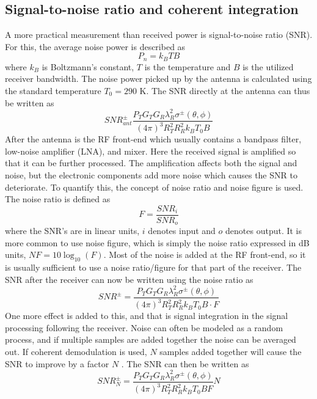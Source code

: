 \documentclass[10pt,a4paper]{eitExjobb}
\begin{document}
	\subsection{Signal-to-noise ratio and coherent integration}
	A more practical measurement than received power is signal-to-noise ratio (SNR). For this, the average noise power is described as \cite{Young2004}
	\begin{equation*}
	P_n = k_B TB
	\end{equation*}
	where $k_B$ is Boltzmann's constant, $T$ is the temperature and $B$ is the utilized receiver bandwidth. The noise power picked up by the antenna is calculated using the standard temperature $T_0 = 290$ K. The SNR directly at the antenna can thus be written as
	\begin{equation*}
	\mathit{SNR}^\pm_{ant} \frac{P_T G_T G_R \lambda_R^2 \sigma^\pm (\theta,\phi)}{(4\pi)^3 R_T^2 R_R^2 k_B T_0 B}
	\end{equation*}
	After the antenna is the RF front-end which usually contains a bandpass filter, low-noise amplifier (LNA), and mixer. Here the received signal is amplified so that it can be further processed. The amplification affects both the signal and noise, but the electronic components add more noise which causes the SNR to deteriorate. To quantify this, the concept of noise ratio and noise figure is used. The noise ratio is defined as \cite{Young2004}
	\begin{equation*}
	F = \frac{\mathit{SNR}_i}{\mathit{SNR}_o}
	\end{equation*}
	where the SNR's are in linear units, $i$ denotes input and $o$ denotes output. It is more common to use noise figure, which is simply the noise ratio expressed in dB units, $\mathit{NF} = 10\log_{10}(F)$. Most of the noise is added at the RF front-end, so it is usually sufficient to use a noise ratio/figure for that part of the receiver. The SNR after the receiver can now be written using the noise ratio as
	\begin{equation*}
	\mathit{SNR}^\pm = \frac{P_T G_T G_R \lambda_R^2 \sigma^\pm (\theta,\phi)}{(4\pi)^3 R_T^2 R_R^2 k_B T_0 B \cdot F}
	\end{equation*}
	One more effect is added to this, and that is signal integration in the signal processing following the receiver. Noise can often be modeled as a random process, and if multiple samples are added together the noise can be averaged out. If coherent demodulation is used, $N$ samples added together will cause the SNR to improve by a factor $N$ \cite{Richards2012}. The SNR can then be written as
	\begin{equation*}
	\textit{SNR}^\pm_N = \frac{P_T G_T G_R \lambda_R^2 \sigma^\pm (\theta,\phi)}{(4\pi)^3 R_T^2 R_R^2 k_B T_0 B F} N
	\end{equation*}
	
\end{document}
